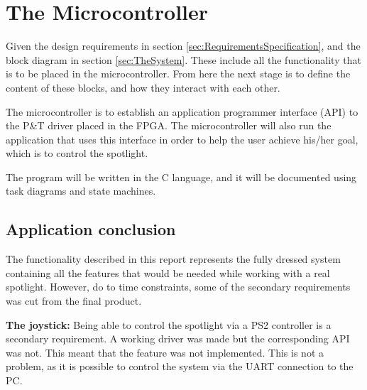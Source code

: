 \section{The Microcontroller}
\label{sec:TheMicrocontroller}

 Given the design requirements in section \ref{sec:RequirementsSpecification}, and the block diagram in section \ref{sec:TheSystem}. These include all the functionality that is to be placed in the microcontroller. From here the next stage is to define the content of these blocks, and how they interact with each other. 
 
 The microcontroller is to establish an application programmer interface (API) to the P\&T driver placed in the FPGA. The microcontroller will also run the application that uses this interface in order to help the user achieve his/her goal, which is to control the spotlight.
 
 The program will be written in the C language, and it will be documented using task diagrams and state machines. 
















\subsection{Application conclusion}

The functionality described in this report represents the fully dressed system containing all the features that would be needed while working with a real spotlight. However, do to time constraints, some of the secondary requirements was cut from the final product.

\textbf{The joystick:} Being able to control the spotlight via a PS2 controller is a secondary requirement. A working driver was made but the corresponding API was not. This meant that the feature was not implemented. This is not a problem, as it is possible to control the system via the UART connection to the PC.


